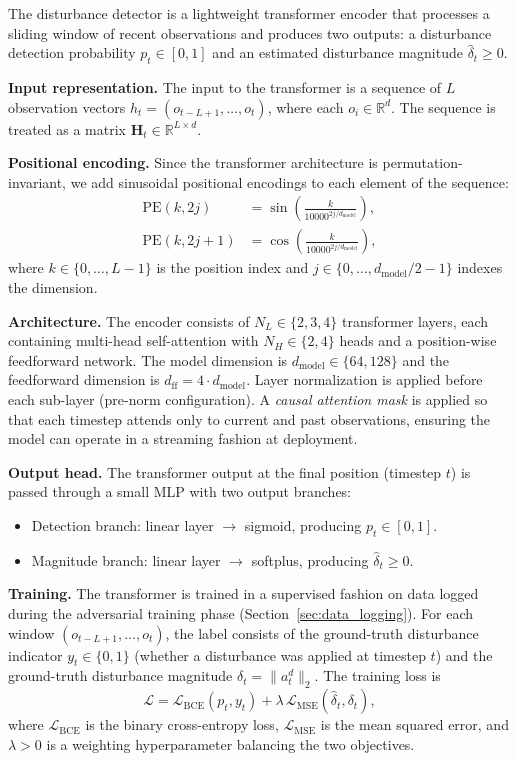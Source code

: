 \documentclass[conference]{IEEEtran}
\newcommand{\R}{\mathbb{R}}
\newcommand{\cL}{\mathcal{L}}
\begin{document}
The disturbance detector is a lightweight transformer encoder that
processes a sliding window of recent observations and produces two
outputs: a disturbance detection probability $p_t \in [0,1]$ and an
estimated disturbance magnitude $\hat{\delta}_t \geq 0$.

\textbf{Input representation.}  The input to the transformer is a sequence
of $L$ observation vectors $h_t = (o_{t-L+1}, \ldots, o_t)$, where
each $o_i \in \R^d$.  The sequence is treated as a matrix
$\boldsymbol{H}_t \in \R^{L \times d}$.

\textbf{Positional encoding.}  Since the transformer architecture is
permutation-invariant, we add sinusoidal positional encodings to each
element of the sequence:
\begin{align}
\text{PE}(k, 2j)   &= \sin\!\left(\frac{k}{10000^{2j/d_{\text{model}}}}\right), \label{eq:pe_sin}\\
\text{PE}(k, 2j+1) &= \cos\!\left(\frac{k}{10000^{2j/d_{\text{model}}}}\right), \label{eq:pe_cos}
\end{align}
where $k \in \{0, \ldots, L-1\}$ is the position index and
$j \in \{0, \ldots, d_{\text{model}}/2 - 1\}$ indexes the dimension.

\textbf{Architecture.}  The encoder consists of $N_L \in \{2, 3, 4\}$
transformer layers, each containing multi-head self-attention with
$N_H \in \{2, 4\}$ heads and a position-wise feedforward network.  The
model dimension is $d_{\text{model}} \in \{64, 128\}$ and the
feedforward dimension is $d_{\text{ff}} = 4 \cdot d_{\text{model}}$.
Layer normalization is applied before each sub-layer (pre-norm
configuration).  A \emph{causal attention mask} is applied so that each
timestep attends only to current and past observations, ensuring the
model can operate in a streaming fashion at deployment.

\textbf{Output head.}  The transformer output at the final position
(timestep $t$) is passed through a small MLP with two output branches:
\begin{itemize}
\item Detection branch: linear layer $\to$ sigmoid, producing
  $p_t \in [0,1]$.
\item Magnitude branch: linear layer $\to$ softplus, producing
  $\hat{\delta}_t \geq 0$.
\end{itemize}

\textbf{Training.}  The transformer is trained in a supervised fashion on
data logged during the adversarial training phase
(Section~\ref{sec:data_logging}).  For each window
$(o_{t-L+1}, \ldots, o_t)$, the label consists of the ground-truth
disturbance indicator $y_t \in \{0,1\}$ (whether a disturbance was
applied at timestep $t$) and the ground-truth disturbance magnitude
$\delta_t = \|a_t^d\|_2$.  The training loss is
\begin{equation}\label{eq:detector_loss}
\cL = \cL_{\text{BCE}}(p_t, y_t) + \lambda\,\cL_{\text{MSE}}(\hat{\delta}_t, \delta_t),
\end{equation}
where $\cL_{\text{BCE}}$ is the binary cross-entropy loss,
$\cL_{\text{MSE}}$ is the mean squared error, and $\lambda > 0$ is a
weighting hyperparameter balancing the two objectives.
\end{document}
